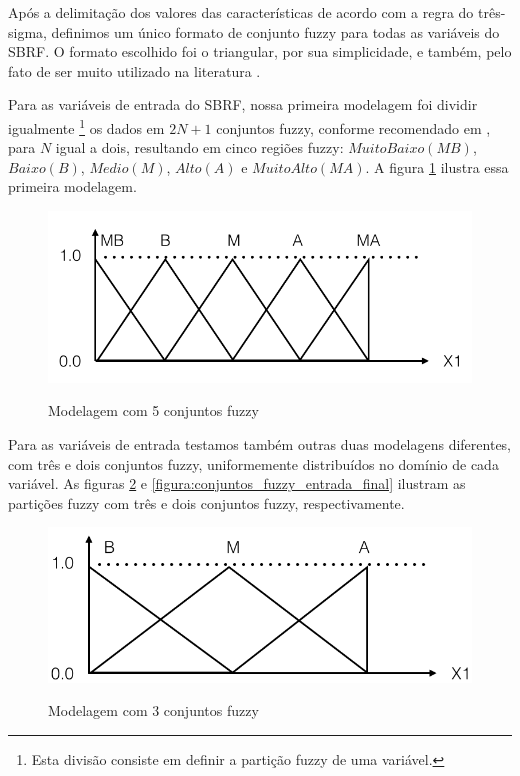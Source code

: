 \documentclass[template.tex]{subfiles}
\begin{document}
Após a delimitação dos valores das características de acordo com a regra do três-sigma, definimos um único formato de conjunto fuzzy para todas as variáveis do SBRF. O formato escolhido foi o triangular, por sua simplicidade, e também, pelo fato de ser muito utilizado na literatura \cite{alcala2009multiobjective, gacto2010integration, antonelli2012multi, cardenas2012multiobjective}.

Para as variáveis de entrada do SBRF, nossa primeira modelagem foi dividir igualmente \footnote{Esta divisão consiste em definir a partição fuzzy de uma variável.} os dados em $2N + 1$ conjuntos fuzzy, conforme recomendado em \cite{wang1992generating}, para $N$ igual a dois, resultando em cinco regiões fuzzy: $Muito Baixo (MB)$, $Baixo (B)$, $Medio (M)$, $Alto (A)$ e $Muito Alto (MA)$. A figura \ref{figura:cinco_conjuntos_fuzzy} ilustra essa primeira modelagem.

\begin{figure}[H]
\caption{Modelagem com 5 conjuntos fuzzy}
\centering
\includegraphics[scale=0.45]{cinco_conjuntos_fuzzy.png}
\label{figura:cinco_conjuntos_fuzzy}
\end{figure}

Para as variáveis de entrada testamos também outras duas modelagens diferentes, com três e dois conjuntos fuzzy, uniformemente distribuídos no domínio de cada variável. As figuras \ref{figura:tres_conjuntos_fuzzy} e \ref{figura:conjuntos_fuzzy_entrada_final} ilustram as partições fuzzy com três e dois conjuntos fuzzy, respectivamente.

\begin{figure}[H]
\caption{Modelagem com 3 conjuntos fuzzy}
\centering
\includegraphics[scale=0.45]{tres_conjuntos_fuzzy.png}
\label{figura:tres_conjuntos_fuzzy}
\end{figure}
\end{document}
